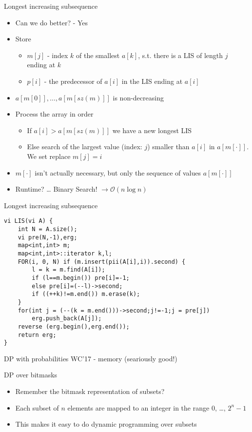 \documentclass[12pt,t]{beamer}
\newcommand{\bi}{\begin{itemize}}
\newcommand{\ei}{\end{itemize}}
\begin{document}
\begin{frame}{Longest increasing subsequence}
    \vspace{20pt}
    \bi
      \item Can we do better? \pause - Yes
      \item Store 
      \bi
    \item $m[j]$ - index $k$ of the smallest $a[k]$, s.t. there is a LIS of length $j$ ending at $k$
    \item $p[i]$ - the predecessor of $a[i]$ in the LIS ending at $a[i]$
      \ei
      \item $a[m[0]],\dots,a[m[sz(m)]]$ is non-decreasing
      \item Process the array in order
      \bi
    \item If $a[i] > a[m[sz(m)]]$ we have a new longest LIS
    \item Else search of the largest value (index: $j$) smaller than $a[i]$ in $a[m[\cdot]]$. We set replace $m[j] = i$
      \ei
      \item $m[\cdot]$ isn't actually necessary, but only the sequence of values $a[m[\cdot]]$
      \item Runtime? \pause \dots{} Binary Search! $\rightarrow \mathcal O(n \log n)$
    \ei
\end{frame}


\begin{frame}[fragile]{Longest increasing subsequence}
    \begin{verbatim}
vi LIS(vi A) {
    int N = A.size();
    vi pre(N,-1),erg;
    map<int,int> m;
    map<int,int>::iterator k,l;
    FOR(i, 0, N) if (m.insert(pii(A[i],i)).second) {
        l = k = m.find(A[i]);
        if (l==m.begin()) pre[i]=-1;
        else pre[i]=(--l)->second;
        if ((++k)!=m.end()) m.erase(k);
    }
    for(int j = (--(k = m.end()))->second;j!=-1;j = pre[j])
        erg.push_back(A[j]);
    reverse (erg.begin(),erg.end());
    return erg;
}
    \end{verbatim}
\end{frame}


\begin{frame}{DP with probabilities}
	WC'17 - memory (seariously good!)
\end{frame}


\begin{frame}{DP over bitmasks}
    \vspace{40pt}
    \bi
        \item Remember the bitmask representation of subsets?
        \item Each subset of $n$ elements are mapped to an integer in the range $0$, \ldots, $2^{n} - 1$
        \item This makes it easy to do dynamic programming over subsets
    \ei
\end{frame}
\end{document}
